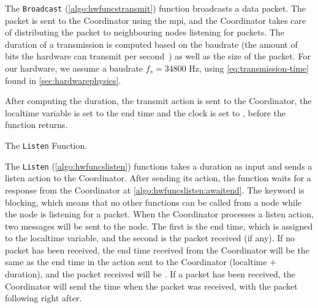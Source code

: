 The \texttt{Broadcast} (\autoref{algo:hwfuncstransmit}) function broadcasts a data packet. The packet is sent to the Coordinator using the \gls{mpi}, and the Coordinator takes care of distributing the packet to neighbouring nodes listening for packets. The duration of a transmission is computed based on the \gls{baudrate} (the amount of bits the hardware can transmit per second~\cite{website:baudrate-mathworks}) as well as the size of the packet. For our hardware, we assume a \gls{baudrate} $f_s = 34800$ Hz, using \autoref{eq:transmission-time} found in \autoref{sec:hardwarephysics}.

After computing the duration, the transmit action is sent to the Coordinator, the localtime variable is set to the end time and the clock is set to \KwNow, before the function returns. \medbreak

\begin{algorithm}[ht]
    \DontPrintSemicolon
    
    
    \caption{The \texttt{Listen} Function.}
    \label{algo:hwfuncslisten}
\end{algorithm}

The \texttt{Listen} (\autoref{algo:hwfuncslisten}) functions takes a duration as input and sends a listen action to the Coordinator. After sending its action, the function waits for a response from the Coordinator at \autoref{algo:hwfuncslisten:awaitend}. The \KwAwait keyword is blocking, which means that no other functions can be called from a node while the node is listening for a packet. When the Coordinator processes a listen action, two messages will be sent to the node. The first is the end time, which is assigned to the localtime variable, and the second is the packet received (if any). If no packet has been received, the end time received from the Coordinator will be the same as the end time in the action sent to the Coordinator (localtime $+$ duration), and the packet received will be \KwNull. If a packet has been received, the Coordinator will send the time when the packet was received, with the packet following right after.

